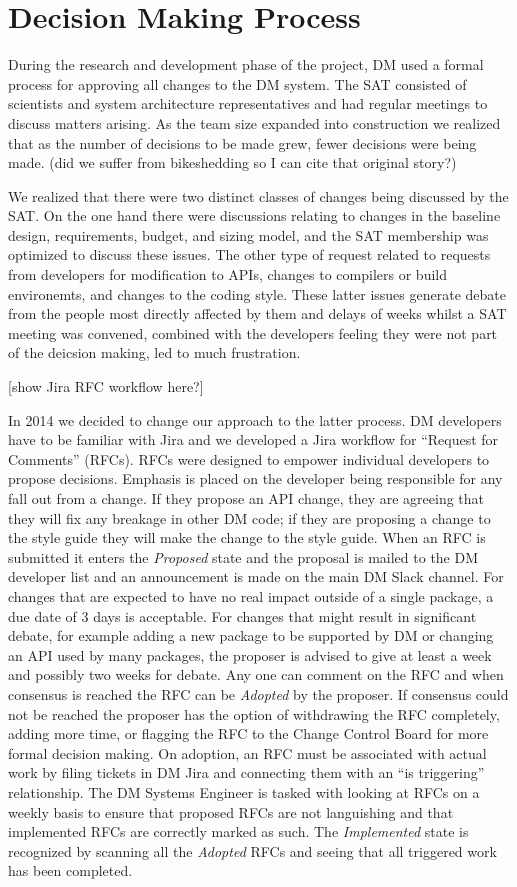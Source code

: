 \section{Decision Making Process}

During the research and development phase of the project, DM used a formal process for approving all changes to the DM system.
The SAT consisted of scientists and system architecture representatives and had regular meetings to discuss matters arising.
As the team size expanded into construction we realized that as the number of decisions to be made grew, fewer decisions were being made. (did we suffer from bikeshedding so I can cite that original story?)

We realized that there were two distinct classes of changes being discussed by the SAT.
On the one hand there were discussions relating to changes in the baseline design, requirements, budget, and sizing model, and the SAT membership was optimized to discuss these issues.
The other type of request related to requests from developers for modification to APIs, changes to compilers or build environemts, and changes to the coding style.
These latter issues generate debate from the people most directly affected by them and delays of weeks whilst a SAT meeting was convened, combined with the developers feeling they were not part of the deicsion making, led to much frustration.

[show Jira RFC workflow here?]

In 2014 we decided to change our approach to the latter process.
DM developers have to be familiar with Jira and we developed a Jira workflow for ``Request for Comments'' (RFCs).
RFCs were designed to empower individual developers to propose decisions.
Emphasis is placed on the developer being responsible for any fall out from a change.
If they propose an API change, they are agreeing that they will fix any breakage in other DM code; if they are proposing a change to the style guide they will make the change to the style guide.
When an RFC is submitted it enters the \emph{Proposed} state and the proposal is mailed to the DM developer list and an announcement is made on the main DM Slack channel.
For changes that are expected to have no real impact outside of a single package, a due date of 3 days is acceptable.
For changes that might result in significant debate, for example adding a new package to be supported by DM or changing an API used by many packages, the proposer is advised to give at least a week and possibly two weeks for debate.
Any one can comment on the RFC and when consensus is reached the RFC can be \emph{Adopted} by the proposer.
If consensus could not be reached the proposer has the option of withdrawing the RFC completely, adding more time, or flagging the RFC to the Change Control Board for more formal decision making.
On adoption, an RFC must be associated with actual work by filing tickets in DM Jira and connecting them with an ``is triggering'' relationship.
The DM Systems Engineer is tasked with looking at RFCs on a weekly basis to ensure that proposed RFCs are not languishing and that implemented RFCs are correctly marked as such.
The \emph{Implemented} state is recognized by scanning all the \emph{Adopted} RFCs and seeing that all triggered work has been completed.

